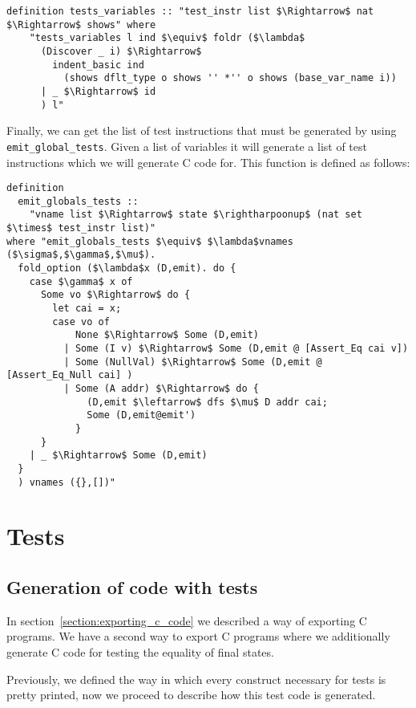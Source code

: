 \begin{lstlisting}[mathescape=true, frame=single]
  definition tests_variables :: "test_instr list $\Rightarrow$ nat $\Rightarrow$ shows" where
    "tests_variables l ind $\equiv$ foldr ($\lambda$
      (Discover _ i) $\Rightarrow$
        indent_basic ind
          (shows dflt_type o shows '' *'' o shows (base_var_name i))
      | _ $\Rightarrow$ id
      ) l"
\end{lstlisting}


Finally, we can get the list of test instructions that must be generated by using \verb|emit_global_tests|.
Given a list of variables it will generate a list of test instructions which we will generate C code for.
This function is defined as follows:


\begin{lstlisting}[mathescape=true, frame=single]
definition
  emit_globals_tests ::
    "vname list $\Rightarrow$ state $\rightharpoonup$ (nat set $\times$ test_instr list)"
where "emit_globals_tests $\equiv$ $\lambda$vnames ($\sigma$,$\gamma$,$\mu$).
  fold_option ($\lambda$x (D,emit). do {
    case $\gamma$ x of
      Some vo $\Rightarrow$ do {
        let cai = x;
        case vo of
            None $\Rightarrow$ Some (D,emit)
          | Some (I v) $\Rightarrow$ Some (D,emit @ [Assert_Eq cai v])
          | Some (NullVal) $\Rightarrow$ Some (D,emit @ [Assert_Eq_Null cai] )
          | Some (A addr) $\Rightarrow$ do {
              (D,emit $\leftarrow$ dfs $\mu$ D addr cai;
              Some (D,emit@emit')
            }
      }
    | _ $\Rightarrow$ Some (D,emit)
  }
  ) vnames ({},[])"
\end{lstlisting}


\section{Tests}

\subsection{Generation of code with tests}\label{subsection:codegen_with_tests}

In section~\ref{section:exporting_c_code} we described a way of exporting C programs.
We have a second way to export C programs where we additionally generate C code for testing the equality of final states.

Previously, we defined the way in which every construct necessary for tests is pretty printed, now we proceed to describe how this test code is generated.

